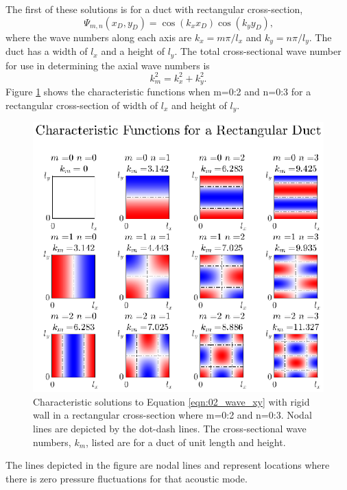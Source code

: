The first of these solutions is for a duct with rectangular cross-section,
\begin{equation}
  \Psi_{m,n}(x_D,y_D) = \cos(k_xx_D)\cos(k_yy_D) \textrm{,}
  \label{eqn:02_psi_rect}
\end{equation}
where the wave numbers along each axis are $k_x = m\pi/l_x$ and $k_y = n\pi/l_y$.
The duct has a width of $l_x$ and a height of $l_y$.
The total cross-sectional wave number for use in determining the axial wave numbers is
\begin{equation}
  k_m^2 = k_x^2+k_y^2 \textrm{.}
  \label{eqn:02_wave_number_crosssection}
\end{equation}
Figure \ref{fig:02_cross_section_rect} shows the characteristic functions when m=0:2 and n=0:3 for a rectangular cross-section of width of $l_x$ and height of $l_y$.
\begin{figure}
  \centering
  \includegraphics[width=\textwidth]{../matlab/02_background/cross_section_rect.eps}
  \caption{Characteristic solutions to Equation \ref{eqn:02_wave_xy} with rigid wall in a rectangular cross-section where m=0:2 and n=0:3.  Nodal lines are depicted by the dot-dash lines.  The cross-sectional wave numbers, $k_m$, listed are for a duct of unit length and height.}
  \label{fig:02_cross_section_rect}
\end{figure}
The lines depicted in the figure are nodal lines and represent locations where there is zero pressure fluctuations for that acoustic mode.

